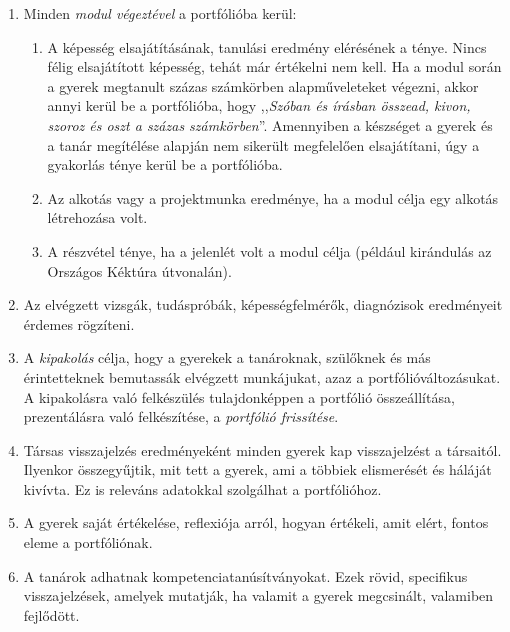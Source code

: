 \begin{enumerate}
      \item Minden \emph{modul végeztével} a portfólióba kerül:

            \begin{enumerate}

                  \item  A képesség elsajátításának, tanulási eredmény elérésének a ténye. Nincs félig elsajátított képesség, tehát már értékelni nem kell. Ha a modul során a gyerek megtanult százas számkörben alapműveleteket végezni,  akkor annyi kerül be a portfólióba, hogy ,,\emph{Szóban és írásban összead, kivon, szoroz és oszt a százas számkörben}''. Amennyiben a készséget a gyerek és a tanár megítélése alapján nem sikerült megfelelően elsajátítani, úgy a gyakorlás ténye kerül be a portfólióba.
                  \item Az alkotás vagy a projektmunka eredménye, ha a modul célja egy alkotás létrehozása volt.
                  \item A részvétel ténye, ha a jelenlét volt a modul célja (például kirándulás az Országos Kéktúra útvonalán).

            \end{enumerate}
      \item Az elvégzett vizsgák, tudáspróbák, képességfelmérők, diagnózisok eredményeit érdemes rögzíteni.

      \item A \emph{kipakolás} célja, hogy a gyerekek a tanároknak, szülőknek és más érintetteknek bemutassák elvégzett munkájukat, azaz a portfólióváltozásukat. A kipakolásra való felkészülés tulajdonképpen a portfólió összeállítása, prezentálásra való felkészítése, a \emph{portfólió frissítése}.

      \item Társas visszajelzés eredményeként minden gyerek kap visszajelzést a társaitól. Ilyenkor összegyűjtik, mit tett a gyerek, ami a többiek elismerését és háláját kivívta. Ez is releváns adatokkal szolgálhat a portfólióhoz.

      \item A gyerek saját értékelése, reflexiója arról, hogyan értékeli, amit elért, fontos eleme a portfóliónak.

      \item A tanárok adhatnak kompetenciatanúsítványokat. Ezek rövid, specifikus visszajelzések, amelyek mutatják, ha valamit a gyerek megcsinált, valamiben fejlődött.
\end{enumerate}

